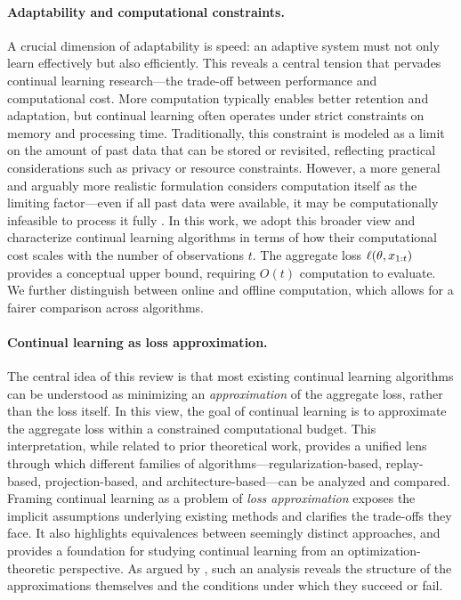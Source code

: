 \documentclass[10pt]{article} %
\begin{document}
\paragraph{Adaptability and computational constraints.}
A crucial dimension of adaptability is speed: an adaptive system must not only learn effectively but also efficiently. This reveals a central tension that pervades continual learning research—the trade-off between performance and computational cost. More computation typically enables better retention and adaptation, but continual learning often operates under strict constraints on memory and processing time.  
Traditionally, this constraint is modeled as a limit on the amount of past data that can be stored or revisited, reflecting practical considerations such as privacy or resource constraints. However, a more general and arguably more realistic formulation considers computation itself as the limiting factor—even if all past data were available, it may be computationally infeasible to process it fully \citep{kumarContinualLearningComputationally2023}. In this work, we adopt this broader view and characterize continual learning algorithms in terms of how their computational cost scales with the number of observations $t$. The aggregate loss $\ell(\theta, x_{1:t})$ provides a conceptual upper bound, requiring $O(t)$ computation to evaluate. We further distinguish between online and offline computation, which allows for a fairer comparison across algorithms.

\paragraph{Continual learning as loss approximation.}
The central idea of this review is that most existing continual learning algorithms can be understood as minimizing an \emph{approximation} of the aggregate loss, rather than the loss itself. In this view, the goal of continual learning is to approximate the aggregate loss within a constrained computational budget. This interpretation, while related to prior theoretical work, provides a unified lens through which different families of algorithms—regularization-based, replay-based, projection-based, and architecture-based—can be analyzed and compared.  
Framing continual learning as a problem of \emph{loss approximation} exposes the implicit assumptions underlying existing methods and clarifies the trade-offs they face. It also highlights equivalences between seemingly distinct approaches, and provides a foundation for studying continual learning from an optimization-theoretic perspective. As argued by \citet{lanzillottaLocalVsGlobal2024}, such an analysis reveals the structure of the approximations themselves and the conditions under which they succeed or fail.
\end{document}
